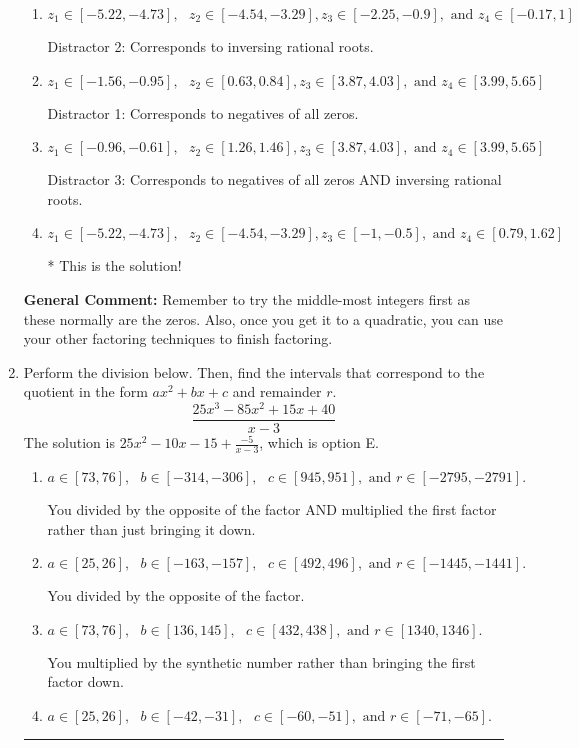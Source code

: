 \documentclass{extbook}[14pt]
\newcommand{\litem}[1]{\item #1

\rule{\textwidth}{0.4pt}}
\begin{document}
\begin{enumerate}
{\begin{enumerate}[label=\Alph*.]
 Distractor 4: Corresponds to moving factors from one rational to another.
\item \( z_1 \in [-5.22, -4.73], \text{   }  z_2 \in [-4.54, -3.29], z_3 \in [-2.25, -0.9], \text{   and   } z_4 \in [-0.17, 1] \)

 Distractor 2: Corresponds to inversing rational roots.
\item \( z_1 \in [-1.56, -0.95], \text{   }  z_2 \in [0.63, 0.84], z_3 \in [3.87, 4.03], \text{   and   } z_4 \in [3.99, 5.65] \)

 Distractor 1: Corresponds to negatives of all zeros.
\item \( z_1 \in [-0.96, -0.61], \text{   }  z_2 \in [1.26, 1.46], z_3 \in [3.87, 4.03], \text{   and   } z_4 \in [3.99, 5.65] \)

 Distractor 3: Corresponds to negatives of all zeros AND inversing rational roots.
\item \( z_1 \in [-5.22, -4.73], \text{   }  z_2 \in [-4.54, -3.29], z_3 \in [-1, -0.5], \text{   and   } z_4 \in [0.79, 1.62] \)

* This is the solution!
\end{enumerate}

\textbf{General Comment:} Remember to try the middle-most integers first as these normally are the zeros. Also, once you get it to a quadratic, you can use your other factoring techniques to finish factoring.
}
\litem{
Perform the division below. Then, find the intervals that correspond to the quotient in the form $ax^2+bx+c$ and remainder $r$.
\[ \frac{25x^{3} -85 x^{2} +15 x + 40}{x -3} \]The solution is \( 25x^{2} -10 x -15 + \frac{-5}{x -3} \), which is option E.\begin{enumerate}[label=\Alph*.]
\item \( a \in [73, 76], \text{   } b \in [-314, -306], \text{   } c \in [945, 951], \text{   and   } r \in [-2795, -2791]. \)

 You divided by the opposite of the factor AND multiplied the first factor rather than just bringing it down.
\item \( a \in [25, 26], \text{   } b \in [-163, -157], \text{   } c \in [492, 496], \text{   and   } r \in [-1445, -1441]. \)

 You divided by the opposite of the factor.
\item \( a \in [73, 76], \text{   } b \in [136, 145], \text{   } c \in [432, 438], \text{   and   } r \in [1340, 1346]. \)

 You multiplied by the synthetic number rather than bringing the first factor down.
\item \( a \in [25, 26], \text{   } b \in [-42, -31], \text{   } c \in [-60, -51], \text{   and   } r \in [-71, -65]. \)


\end{enumerate}}
\end{enumerate}
\end{document}
